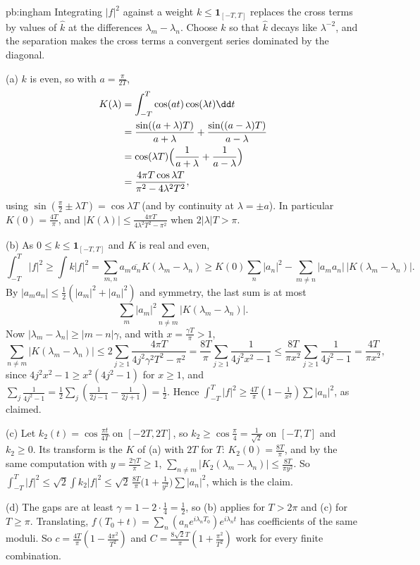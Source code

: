 \begin{solution}{pb:ingham}
\idea Integrating $|f|^2$ against a weight $k\le\mathbf 1_{[-T,T]}$ replaces the cross terms by values of $\hat k$ at the differences $\lambda_m-\lambda_n$. Choose $k$ so that $\hat k$ decays like
$\lambda^{-2}$, and the separation makes the cross terms a convergent series dominated by the diagonal.

\writeup (a) $k$ is even, so with $a=\frac\pi{2T}$,
\[
\begin{aligned}
K(\lambda)&=\int_{-T}^T\cos(at)\cos(\lambda t)\dd t\\
&=\frac{\sin((a+\lambda)T)}{a+\lambda}+\frac{\sin((a-\lambda)T)}{a-\lambda}\\
&=\cos(\lambda T)\Bigl(\frac1{a+\lambda}+\frac1{a-\lambda}\Bigr)\\
&=\frac{4\pi T\cos\lambda T}{\pi^2-4\lambda^2T^2},
\end{aligned}
\]
using $\sin(\frac\pi2\pm\lambda T)=\cos\lambda T$ (and by continuity at $\lambda=\pm a$). In particular $K(0)=\frac{4T}\pi$, and $|K(\lambda)|\le\frac{4\pi T}{4\lambda^2T^2-\pi^2}$ when $2|\lambda|T>\pi$.

(b) As $0\le k\le\mathbf 1_{[-T,T]}$ and $K$ is real and even,
\[
\int_{-T}^T|f|^2\ge\int k|f|^2=\sum_{m,n}a_m\overline{a_n}K(\lambda_m-\lambda_n)\ge K(0)\sum_n|a_n|^2-\sum_{m\ne n}|a_ma_n|\,|K(\lambda_m-\lambda_n)|.
\]
By $|a_ma_n|\le\frac12(|a_m|^2+|a_n|^2)$ and symmetry, the last sum is at most
\[
\sum_m|a_m|^2\sum_{n\ne m}|K(\lambda_m-\lambda_n)|.
\] Now $|\lambda_m-\lambda_n|\ge|m-n|\gamma$, and with
$x=\frac{\gamma T}\pi>1$,
\[
\sum_{n\ne m}|K(\lambda_m-\lambda_n)|\le2\sum_{j\ge1}\frac{4\pi T}{4j^2\gamma^2T^2-\pi^2}=\frac{8T}\pi\sum_{j\ge1}\frac1{4j^2x^2-1}\le\frac{8T}{\pi x^2}\sum_{j\ge1}\frac1{4j^2-1}=\frac{4T}{\pi x^2},
\]
since $4j^2x^2-1\ge x^2(4j^2-1)$ for $x\ge1$, and $\sum_j\frac1{4j^2-1}=\frac12\sum_j(\frac1{2j-1}-\frac1{2j+1})=\frac12$. Hence $\int_{-T}^T|f|^2\ge\frac{4T}\pi(1-\frac1{x^2})\sum|a_n|^2$, as claimed.

(c) Let $k_2(t)=\cos\frac{\pi t}{4T}$ on $[-2T,2T]$, so $k_2\ge\cos\frac\pi4=\frac1{\sqrt2}$ on $[-T,T]$ and $k_2\ge0$. Its transform is the $K$ of (a) with $2T$ for $T$: $K_2(0)=\frac{8T}\pi$, and by
the same computation with $y=\frac{2\gamma T}\pi\ge1$, $\sum_{n\ne m}|K_2(\lambda_m-\lambda_n)|\le\frac{8T}{\pi y^2}$. So
$\int_{-T}^T|f|^2\le\sqrt2\int k_2|f|^2\le\sqrt2\,\frac{8T}\pi\bigl(1+\frac1{y^2}\bigr)\sum|a_n|^2$, which is the claim.

(d) The gaps are at least $\gamma=1-2\cdot\frac14=\frac12$, so (b) applies for $T>2\pi$ and (c) for $T\ge\pi$. Translating, $f(T_0+t)=\sum_n(a_ne^{i\lambda_nT_0})e^{i\lambda_nt}$ has coefficients of
the same moduli. So $c=\frac{4T}\pi(1-\frac{4\pi^2}{T^2})$ and $C=\frac{8\sqrt2T}\pi(1+\frac{\pi^2}{T^2})$ work for every finite combination.


\end{solution}
